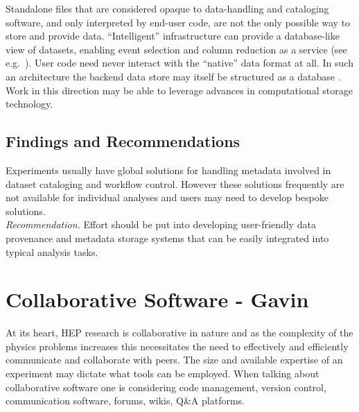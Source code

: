 Standalone files that are considered opaque to data-handling and cataloging software, and only interpreted by end-user code, are not the only possible way to store and provide data. ``Intelligent'' infrastructure can provide a database-like view of datasets, enabling event selection and column reduction as a service (see e.g.\ \cite{Galewsky:2020xig}). User code need never interact with the ``native'' data format at all. In such an architecture the backend data store may itself be structured as a database \cite{Gutsche:2020kmd}. Work in this direction may be able to leverage advances in computational storage technology.

\subsection{Findings and Recommendations}
Experiments usually have global solutions for handling metadata involved in dataset cataloging and workflow control. However these solutions frequently are not available for individual analyses and users may need to develop bespoke solutions.\\
\textit{Recommendation.} Effort should be put into developing user-friendly data provenance and metadata storage systems that can be easily integrated into typical analysis tasks.

\section{Collaborative Software - Gavin}
\begin{comment}
T. Aarrestad et al. [HEP Software Foundation], “HL-LHC Computing Review: Common Tools and Community Software”, arXiv:2008.13636 [physics.comp-ph ]] (pdf).~\cite{10.5281/zenodo.4009114}

Simone Campana, Alessandro Di Girolamo, Paul Laycock, Zach Marshall, Heidi Schellman, Graeme A Stewart. ”HEP computing collaborations for the challenges of the next decade”, arXiv:2203.07237 [physics.comp-ph] (pdf).~\cite{arxiv.2203.07237}

Dave Casper, Maria Elena Monzani, Benjamin Nachman, Costas Andreopoulos, Stephen Bailey, Deborah Bard, et al. ”Software and Computing for Small HEP Experiments“, arXiv:2203.07645 [hep-ex] (pdf). (also under EF0, NF0, RF0, CF0)~\cite{arxiv.2203.07645}

\end{comment}

At its heart, HEP research is collaborative in nature and as the complexity of the physics problems increases this necessitates the need to effectively and efficiently communicate and collaborate with peers.
The size and available expertise of an experiment may dictate what tools can be employed. When talking about collaborative software one is considering code management, version control, communication software, forums, wikis, Q\&A platforms.
